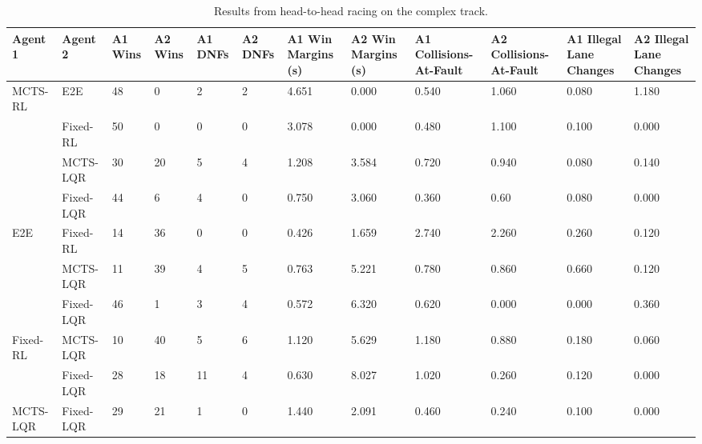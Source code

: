 \begin{table}[H]
\centering
\begin{adjustbox}{width=\textwidth}
\begin{tabular}{llp{1.1cm}p{1.1cm}p{1.1cm}p{1.1cm}p{1.5cm}p{1.5cm}p{1.5cm}p{1.5cm}p{1.5cm}p{1.5cm}}
\toprule
        Agent 1 & Agent 2 & A1 Wins & A2 Wins & A1 DNFs & A2 DNFs & A1 Win Margins (\si{\second}) & A2 Win Margins (\si{\second}) & A1 Collisions-At-Fault & A2 Collisions-At-Fault & A1 Illegal Lane Changes & A2 Illegal Lane Changes \\ \hline
        MCTS-RL & E2E & 48 & 0 & 2 & 2 & 4.651 & 0.000 & 0.540 & 1.060 & 0.080 & 1.180 \\ 
        ~ & Fixed-RL & 50 & 0 & 0 & 0 & 3.078 & 0.000 & 0.480 & 1.100 & 0.100 & 0.000 \\ 
        ~ & MCTS-LQR & 30 & 20 & 5 & 4 & 1.208 & 3.584 & 0.720 & 0.940 & 0.080 & 0.140 \\ 
        ~ & Fixed-LQR & 44 & 6 & 4 & 0 & 0.750 & 3.060 & 0.360 & 0.60 & 0.080 & 0.000 \\ 
        E2E & Fixed-RL & 14 & 36 & 0 & 0 & 0.426 & 1.659 & 2.740 & 2.260 & 0.260 & 0.120 \\ 
        ~ & MCTS-LQR & 11 & 39 & 4 & 5 & 0.763 & 5.221 & 0.780 & 0.860 & 0.660 & 0.120 \\ 
        ~ & Fixed-LQR & 46 & 1 & 3 & 4 & 0.572 & 6.320 & 0.620 & 0.000 & 0.000 & 0.360 \\
        Fixed-RL & MCTS-LQR & 10 & 40 & 5 & 6 & 1.120 & 5.629 & 1.180 & 0.880 & 0.180 & 0.060 \\ 
        ~ & Fixed-LQR & 28 & 18 & 11 & 4 & 0.630 & 8.027 & 1.020 & 0.260 & 0.120 & 0.000 \\ 
        MCTS-LQR & Fixed-LQR & 29 & 21 & 1 & 0 & 1.440 & 2.091 & 0.460 & 0.240 & 0.100 & 0.000 \\ \bottomrule
\end{tabular}
\end{adjustbox}
\vspace{1 mm}
\caption{Results from head-to-head racing on the complex track.}
 \label{tab:results_complex}
\end{table}

